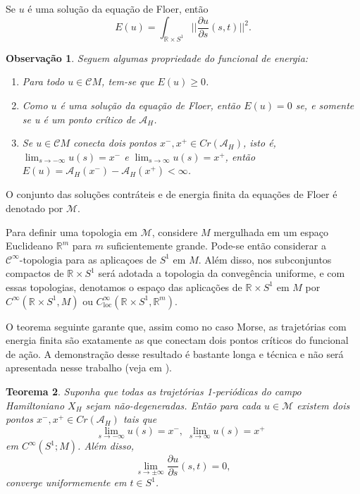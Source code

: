 \documentclass[12pt]{book}
\newtheorem{teorema}{Teorema}[section]
\newtheorem{observacao}[teorema]{Observação}
\newcommand{\aplicaoessuaves}[2]{C^{\infty}(#1, #2)}
\newcommand{\aplicaoessuavesloc}[2]{C^{\infty}_{\text{loc}}(#1, #2)}
\newcommand{\campohamiltonianoabrev}{X_{H}}
\newcommand{\circulo}{S^{1}}
\newcommand{\cktopologia}[1]{\mathcal{C}^{#1}\text{-topologia}}
\newcommand{\derivadaparcial}[2]{\frac{\partial #1}{\partial #2}}
\newcommand{\energiafinitaM}{\mathcal{M}}
\newcommand{\funcionalH}{\mathcal{A}_{H}}
\newcommand{\normagrande}[1]{\Big|\Big|#1\Big|\Big|}
\newcommand{\pontoscriticos}[1]{\textit{Cr}(#1)}
\newcommand{\retacartesianocirculo}{\real{} \times \circulo}
\newcommand{\real}[1]{\mathbb{R}^{#1}}
\newcommand{\cilindrosLM}{\mathcal{C}M}
\begin{document}
	Se $u$ é uma solução da equação de Floer, então
	$$
	E(u)=\int_{\retacartesianocirculo}\normagrande{\derivadaparcial{u}{s}(s,t)}^{2}.
	$$
	\begin{observacao}
		Seguem algumas propriedade do funcional de energia:
		
		\begin{enumerate}
			\item Para todo $u \in \cilindrosLM$, tem-se que $E(u)\geq 0$.
			
			\item Como $u$ é uma solução da equação de Floer,  então $E(u)=0$ se, e somente se u é um ponto crítico de $\funcionalH$.
			
			\item Se $u \in \cilindrosLM$ conecta dois pontos $x^{-}, x^{+} \in \pontoscriticos{\funcionalH}$, isto é, $\lim_{s\to -\infty}u(s)=x^{-}$ e $\lim_{s\to \infty}u(s)=x^{+}$, então $E(u)=\funcionalH(x^{-}) - \funcionalH(x^{+})<\infty$.
		\end{enumerate}
		
	\end{observacao}
	
	O conjunto das soluções contráteis e de energia finita da equações de Floer é denotado por $\energiafinitaM$.

	Para definir uma topologia em $\energiafinitaM$, considere $M$ mergulhada em um espaço Euclideano $\real{m}$ para $m$ suficientemente grande. Pode-se então considerar a $\cktopologia{\infty}$ 
	para as aplicaçoes de $\circulo$ em $M$. Além disso, nos subconjuntos compactos de $\retacartesianocirculo$ será adotada a topologia da convegência uniforme, e com essas topologias, denotamos o espaço das aplicações de $\retacartesianocirculo$ em $M$ por $\aplicaoessuaves{\retacartesianocirculo}{M}$ ou  $\aplicaoessuavesloc{\retacartesianocirculo}{\real{m}}$.
	
	O teorema seguinte garante que, assim como no caso Morse, as trajetórias com energia finita são exatamente as que conectam dois pontos críticos do funcional de ação. A demonstração desse resultado é bastante longa e técnica e não será apresentada nesse trabalho (veja em \cite{audi_floer_homology}).
	
	\begin{teorema}\label{teorema_limite_solucoes_energia_finita}
		Suponha que todas as trajetórias 1-periódicas do campo Hamiltoniano $\campohamiltonianoabrev$ sejam não-degeneradas. Então para cada $u \in \energiafinitaM$ existem dois pontos $x^{-}, x^{+}\in \pontoscriticos{\funcionalH}$ tais que
		$$
		\lim_{s\to -\infty}u(s)=x^{-},\; \lim_{s\to \infty}u(s)=x^{+}\;\;
		$$
		em $C^{\infty}(\circulo;M)$. Além disso, 
		$$
		\lim_{s\to \pm \infty}\derivadaparcial{u}{s}(s,t) = 0,
		$$
		converge uniformemente em $t\in \circulo$.
	\end{teorema}
\end{document}
